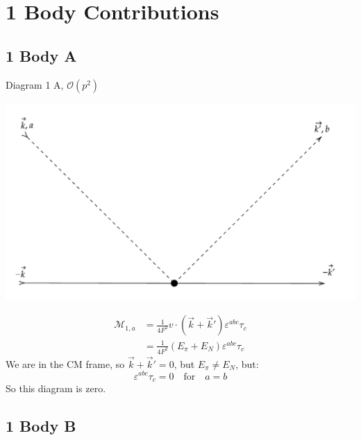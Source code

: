 \documentclass[11pt]{article}
\newcommand\mo{\mathcal{O}}
\newcommand\mm{\mathcal{M}}
\begin{document}
\section{1 Body Contributions}
\subsection{1 Body A}
Diagram 1 A, $\mo(p^2)$
\begin{center}
    \includegraphics[scale=0.65]{1a.pdf}
\end{center}
\begin{align}
    \mm_{1,a}&= \frac{1}{4 F^2} v \cdot \left( \vec{k} +\vec{k}' \right) \varepsilon^{abc} \tau_c\\
             &= \frac{1}{4 F^2} (E_\pi+E_N)\varepsilon^{abc} \tau_c
\end{align}
We are in the CM frame, so $\vec{k}+\vec{k}'=0$, but $E_\pi\neq E_N$, but:
\begin{equation}
    \varepsilon^{abc} \tau_c= 0 \quad \text{for}\quad a=b   
\end{equation}
So this diagram is zero.
\newpage
\subsection{1 Body B}
\end{document}
